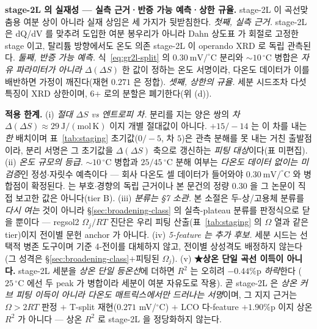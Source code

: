 \medskip
\textbf{stage-2L 의 실재성 --- 실측 근거·반증 가능 예측·상한 규율.} stage-2L 이 곡선맞춤용 여분 상이 아니라 실재 상임은 세 가지가 뒷받침한다. \emph{첫째, 실측 근거.}
stage-2L 은 dQ/dV 를 맞추려 도입한 여분 봉우리가 아니라 Dahn 상도표\cite{dahn1991} 가 회절로 고정한 stage
이고, 탈리튬 방향에서도 온도 의존 stage-2L 이 operando XRD 로 독립 관측된다\cite{schmitt2022}. \emph{둘째,
반증 가능 예측.} 식~\eqref{eq:gr2l-split} 의 $0.30\ \mathrm{mV/^\circ C}$ 분리와 $\sim10\,^\circ$C 병합은
\emph{자유 파라미터가 아니라} $\Delta(\Delta S)$ 한 값이 정하는 온도 서명이라, 다온도 데이터가 이를 배반하면
가정이 깨진다(재현 $0.271$ 은 정합). \emph{셋째, 상한의 규율.} 세분 시드조차 다섯 특징이 XRD 상한이며, 6+ 로의
분할은 폐기한다(위 (d)).

\begin{warnbox}
\textbf{적용 한계.} (i) \emph{절대 $\Delta S$ vs 엔트로피 \emph{차}.} 분리를 지는 양은 쌍의 \emph{차}
$\Delta(\Delta S)\approx29\ \mathrm{J/(mol\,K)}$ 이지 개별 절대값이 아니다. $+15/-14$ 는 이 차를 내는 \emph{한}
배치이며 표~\ref{tab:staging} 초기값($0/-5$, 차 $5$)은 관측 분해를 못 내는 거친 출발점이라, 분리 서명은 그
초기값을 $\Delta(\Delta S)$ 축으로 갱신하는 \emph{피팅 대상}이다(표 미편집). (ii) \emph{온도 규모의 등급.}
$\sim10\,^\circ$C 병합과 $25/45\,^\circ$C 분해 여부는 \emph{다온도 데이터 없이는 미검증}인 정성$\cdot$자릿수
예측이다 --- 회사 다온도 셀 데이터가 들어와야 $0.30\ \mathrm{mV/^\circ C}$ 와 병합점이 확정된다.
\cite{schmitt2022} 는 부호$\cdot$경향의 독립 근거이나 본 문건의 정량 $0.30$ 을 그 논문이 직접 보고한 값은
아니다(tier B). (iii) \emph{분류는 §7 소관.} 본 소절은 두-상/고용체 분류를 \emph{다시 여는} 것이 아니라
\S\ref{sec:broadening-class} 의 실측-plateau 분류를 판정식으로 닫을 뿐이다 --- regsol2 $\Omega_j/RT$ 진단은 우리
피팅 산출(표~\ref{tab:staging} 의 $\Omega$ 열과 같은 tier)이지 전이별 문헌 anchor 가 아니다. (iv) \emph{5-feature
는 추가 후보.} 세분 시드는 선택적 병존 도구이며 기준 4-전이를 대체하지 않고, 전이별 상성격도 배정하지 않는다
(그 성격은 \S\ref{sec:broadening-class}$+$피팅된 $\Omega_j$). (v) \textbf{★상온 단일 곡선
이득이 아니다.} stage-2L 세분을 \emph{상온 단일 등온선}에 더하면 $R^2$ 는 오히려 $-0.44\%$p \emph{하락}한다
($25\,^\circ$C 에선 두 peak 가 병합이라 세분이 여분 자유도로 작용). 곧 stage-2L 은 \emph{상온 커브 피팅 이득이
아니라 다온도 매트릭스에서만 드러나는 서명}이며, 그 지지 근거는 $\Omega>2RT$ 판정 $+$ T-split 재현($0.271$
mV/$^\circ$C) $+$ LCO 다-feature $+1.90\%$p 이지 상온 $R^2$ 가 아니다 --- 상온 $R^2$ 로 stage-2L 을 정당화하지 않는다.
\end{warnbox}

